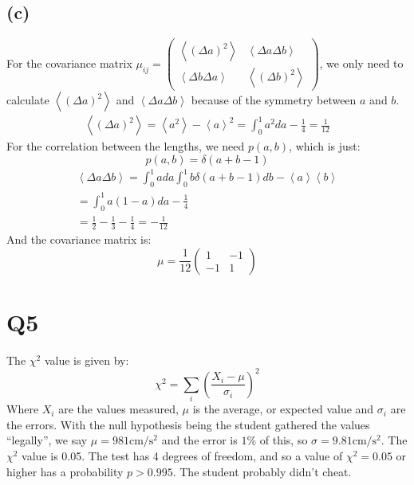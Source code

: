 \documentclass[../main.tex]{subfiles}
\begin{document}
\subsection*{(c)}
For the covariance matrix $\mu_{ij} = \left(\begin{matrix}\left<(\Delta a)^2\right> & \left<\Delta a\Delta b\right> \\ \left<\Delta b\Delta a\right> & \left<(\Delta b)^2\right>\end{matrix}\right)$, we only need to calculate $\left<(\Delta a)^2\right>$ and $\left<\Delta a\Delta b\right>$ because of the symmetry between $a$ and $b$. 
\begin{align*}
	\left<(\Delta a)^2\right> = \left<a^2\right> - \left<a\right>^2 = \int_0^1a^2da - \frac{1}{4} = \frac{1}{12}
\end{align*}
For the correlation between the lengths, we need $p(a, b)$, which is just:
\begin{equation}
	p(a, b) = \delta(a+b-1)
\end{equation}
\begin{align*}
	\left<\Delta a\Delta b\right> = \int_0^1ada\int_0^1b\delta(a+b-1)db - \left<a\right>\left<b\right> \\
	= \int_0^1a (1-a)da - \frac{1}{4} \\
	= \frac{1}{2}-\frac{1}{3}-\frac{1}{4} = -\frac{1}{12}
\end{align*}
And the covariance matrix is:
\begin{equation}
	\mu = \frac{1}{12}\left(\begin{matrix}1 & -1 \\ -1 & 1\end{matrix}\right)
\end{equation}
\section*{Q5}
The $\chi^2$ value is given by:
\begin{equation}
	\chi^2 = \sum_i \left(\frac{X_i-\mu}{\sigma_i}\right)^2
\end{equation}
Where $X_i$ are the values measured, $\mu$ is the average, or expected value and $\sigma_i$ are the errors.
With the null hypothesis being the student gathered the values ``legally'', we say $\mu=981\text{cm/s$^2$}$ and the error is $1\%$ of this, so $\sigma=9.81\text{cm/s$^2$}$. The $\chi^2$ value is 0.05. The test has 4 degrees of freedom, and so a value of $\chi^2=0.05$ or higher has a probability $p>0.995$. The student probably didn't cheat.
\end{document}
